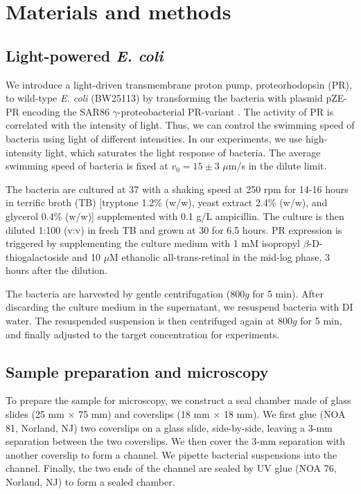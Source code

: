 \documentclass[twocolumn,aps,prx,amsmath,amssymb,longbibliography,superscriptaddress]{revtex4-2}
\begin{document}
\appendix
\section{Materials and methods} \label{appendix-MM}
\subsection{Light-powered \textit{E. coli}}
We introduce a light-driven transmembrane proton pump, proteorhodopsin (PR), to wild-type \textit{E. coli} (BW25113) by transforming the bacteria with plasmid pZE-PR encoding the SAR86 $\gamma$-proteobacterial PR-variant \cite{Walter2007}. The activity of PR is correlated with the intensity of light. Thus, we can control the swimming speed of bacteria using light of different intensities. In our experiments, we use high-intensity light, which saturates the light response of bacteria. The average swimming speed of bacteria is fixed at $v_0 = 15 \pm 3$ $\mu$m/s in the dilute limit.

The bacteria are cultured at 37 \textcelsius{} with a shaking speed at 250 rpm for 14-16 hours in terrific broth (TB) [tryptone 1.2\% (w/w), yeast extract 2.4\% (w/w), and glycerol 0.4\% (w/w)] supplemented with 0.1 g/L ampicillin. The culture is then diluted 1:100 (v:v) in fresh TB and grown at 30 \textcelsius{} for 6.5 hours. PR expression is triggered by supplementing the culture medium with 1 mM isopropyl $\beta$-D-thiogalactoside and 10  $\mu$M ethanolic all-trans-retinal in the mid-log phase, 3 hours after the dilution.

The bacteria are harvested by gentle centrifugation ($800g$ for 5 min). After discarding the culture medium in the supernatant, we resuspend bacteria with DI water. The resuspended suspension is then centrifuged again at $800g$ for 5 min, and finally adjusted to the target concentration for experiments.

\subsection{Sample preparation and microscopy}

To prepare the sample for microscopy, we construct a seal chamber made of glass slides (25 mm $\times$ 75 mm) and coverslips (18 mm $\times$ 18 mm). We first glue (NOA 81, Norland, NJ) two coverslips on a glass slide, side-by-side, leaving a 3-mm separation between the two coverslips. We then cover the 3-mm separation with another coverslip to form a channel. We pipette bacterial suspensions into the channel. Finally, the two ends of the channel are sealed by UV glue (NOA 76, Norland, NJ) to form a sealed chamber.
\end{document}
